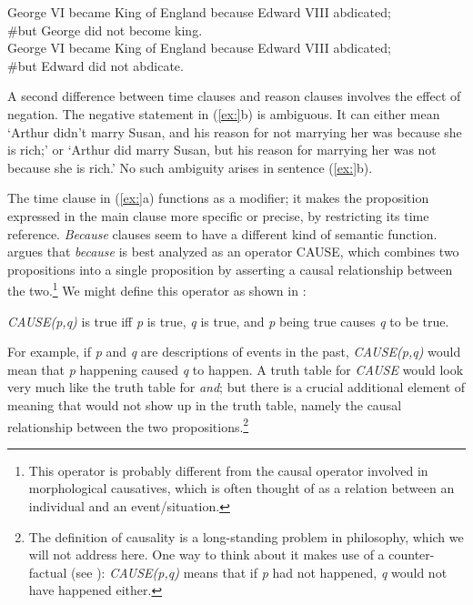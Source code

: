 \ea
\ea George VI became King of England because Edward VIII abdicated;\\
  \#but George did not become king.\\
\ex George VI became King of England because Edward VIII abdicated;\\
  \#but Edward did not abdicate.
                       \z
\z


A second difference between time clauses and reason clauses involves the effect of negation. The negative statement in (\ref{ex:}b) is ambiguous. It can either mean ‘Arthur didn’t marry Susan, and his reason for not marrying her was because she is rich;’ or ‘Arthur did marry Susan, but his reason for marrying her was not because she is rich.’ No such ambiguity arises in sentence (\ref{ex:}b).



The time clause in (\ref{ex:}a) functions as a modifier; it makes the proposition expressed in the main clause more specific or precise, by restricting its time reference. \textit{Because} clauses seem to have a different kind of semantic function. \citet{Johnston1994} argues that \textit{because} is best analyzed as an operator CAUSE, which combines two propositions into a single proposition by asserting a causal relationship between the two.\footnote{This operator is probably different from the causal operator involved in morphological causatives, which is often thought of as a relation between an individual and an event/situation.} We might define this operator as shown in :


\begin{stylepoints}
\textit{CAUSE(p,q)} is true iff \textit{p} is true, \textit{q} is true, and \textit{p} being true causes \textit{q} to be true.
\end{stylepoints}


For example, if \textit{p} and \textit{q} are descriptions of events in the past, \textit{CAUSE(p,q)} would mean that \textit{p} happening caused \textit{q} to happen. A truth table for \textit{CAUSE} would look very much like the truth table for \textit{and}; but there is a crucial additional element of meaning that would not show up in the truth table, namely the causal relationship between the two propositions.\footnote{The definition of causality is a long-standing problem in philosophy, which we will not address here. One way to think about it makes use of a counter-factual (see ): \textit{CAUSE(p,q)} means that if \textit{p} had not happened, \textit{q} would not have happened either.}



